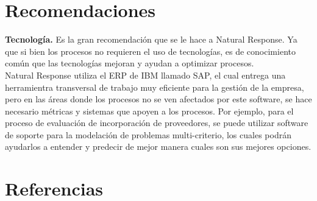 \documentclass[12pt,letterpaper]{article}
\begin{document}
\section{Recomendaciones}
\textbf{Tecnología.} Es la gran recomendación que se le hace a Natural Response. Ya que si bien los procesos no requieren el uso de tecnologías, es de conocimiento común que las tecnologías mejoran y ayudan a optimizar procesos.\\
Natural Response utiliza el ERP de IBM llamado SAP, el cual entrega una herramientra transversal de trabajo muy eficiente para la gestión de la empresa, pero en las áreas donde los procesos no se ven afectados por este software, se hace necesario métricas y sistemas que apoyen a los procesos. Por ejemplo, para el proceso de evaluación de incorporación de proveedores, se puede utilizar software de soporte para la modelación de problemas multi-criterio, los cuales podrán ayudarlos a entender y predecir de mejor manera cuales son sus mejores opciones.

\section{Referencias}
\end{document}

